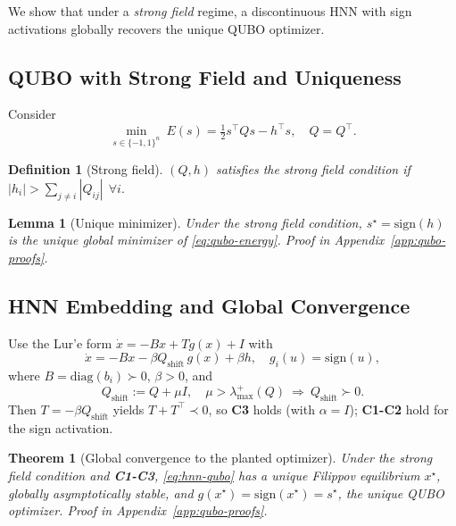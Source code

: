 \documentclass[journal]{IEEEtran}
\newtheorem{theorem}{Theorem}
\newtheorem{lemma}{Lemma}
\newtheorem{definition}{Definition}
\begin{document}
We show that under a \emph{strong field} regime, 
a discontinuous HNN with sign activations globally recovers the unique QUBO optimizer.

\subsection{QUBO with Strong Field and Uniqueness}
Consider
\begin{equation}\label{eq:qubo-energy}
  \min_{s\in\{-1,1\}^n}\ E(s)=\tfrac12 s^\top Q s - h^\top s,\quad Q=Q^\top.
\end{equation}
\begin{definition}[Strong field]\label{def:strong-field}
\((Q,h)\) satisfies the strong field condition if
\(
|h_i|>\sum_{j\neq i}|Q_{ij}|\ \ \forall i.
\)
\end{definition}
\begin{lemma}[Unique minimizer]\label{lem:qubo-unique}
Under the strong field condition, \(s^\star=\mathrm{sign}(h)\) 
is the unique global minimizer of \eqref{eq:qubo-energy}. 
Proof in Appendix~\ref{app:qubo-proofs}.
\end{lemma}

\subsection{HNN Embedding and Global Convergence}
Use the Lur’e form \(\dot x=-Bx+Tg(x)+I\) with
\begin{equation}\label{eq:hnn-qubo}
  \dot x = -B x - \beta Q_{\mathrm{shift}}\, g(x) + \beta h,\quad
  g_i(u)=\mathrm{sign}(u),
\end{equation}
where \(B=\mathrm{diag}(b_i)\succ0\), \(\beta>0\), and
\begin{equation}\label{eq:Qshift}
  Q_{\mathrm{shift}}:=Q+\mu I,\quad \mu>\lambda^+_{\max}(Q)\ \Rightarrow\ Q_{\mathrm{shift}}\succ0.
\end{equation}
Then \(T=-\beta Q_{\mathrm{shift}}\) yields \(T+T^\top\prec0\), so \textbf{C3} holds (with \(\alpha=I\)); \textbf{C1-C2} hold for the sign activation.
\begin{theorem}[Global convergence to the planted optimizer]\label{th:hnn-solves-strong-field-qubo}
Under the strong field condition and \textbf{C1-C3}, \eqref{eq:hnn-qubo} has a unique Filippov equilibrium \(x^\star\), globally asymptotically stable, and \(g(x^\star)=\mathrm{sign}(x^\star)=s^\star\), the unique QUBO optimizer. 
Proof in Appendix~\ref{app:qubo-proofs}.
\end{theorem}
\end{document}
